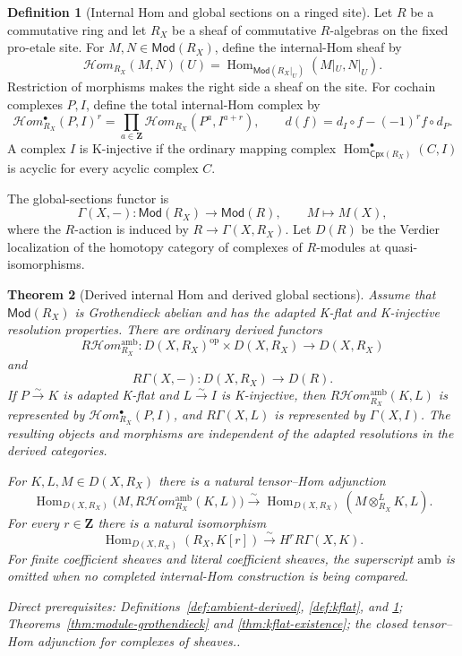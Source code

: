 \documentclass[10pt]{article}
\newtheorem{theorem}{Theorem}[section]
\theoremstyle{definition}
\newtheorem{definition}[theorem]{Definition}
\newcommand{\Hom}{\operatorname{Hom}}
\newcommand{\depends}[1]{\par\smallskip\noindent\textit{Direct prerequisites:} #1.}
\begin{document}
\begin{definition}[Internal Hom and global sections on a ringed site]
\label{def:ambient-hom-sections}
Let $R$ be a commutative ring and let $R_X$ be a sheaf of commutative
$R$-algebras on the fixed pro-etale site.  For
$M,N\in\mathsf{Mod}(R_X)$, define the internal-Hom sheaf by
\[
 \mathcal Hom_{R_X}(M,N)(U)=
 \Hom_{\mathsf{Mod}(R_X|_U)}(M|_U,N|_U).
\]
Restriction of morphisms makes the right side a sheaf on the site.  For
cochain complexes $P,I$, define the total internal-Hom complex by
\[
 \mathcal Hom_{R_X}^{\bullet}(P,I)^r
 =\prod_{a\in\mathbf Z}
   \mathcal Hom_{R_X}(P^a,I^{a+r}),
 \qquad
 d(f)=d_I\circ f-(-1)^r f\circ d_P.
\]
A complex $I$ is K-injective if the ordinary mapping complex
$\operatorname{Hom}^{\bullet}_{\mathsf{Cpx}(R_X)}(C,I)$ is acyclic for
every acyclic complex $C$.

The global-sections functor is
\[
 \Gamma(X,-):\mathsf{Mod}(R_X)\longrightarrow\mathsf{Mod}(R),
 \qquad M\longmapsto M(X),
\]
where the $R$-action is induced by $R\to\Gamma(X,R_X)$.  Let $D(R)$ be
the Verdier localization of the homotopy category of complexes of
$R$-modules at quasi-isomorphisms.
\end{definition}

\begin{theorem}[Derived internal Hom and derived global sections]
\label{thm:ambient-hom-sections}
Assume that $\mathsf{Mod}(R_X)$ is Grothendieck abelian and has the adapted
K-flat and K-injective resolution properties.  There are ordinary derived
functors
\[
 R\mathcal Hom_{R_X}^{\mathrm{amb}}:
 D(X,R_X)^{\mathrm{op}}\times D(X,R_X)
 \longrightarrow D(X,R_X)
\]
and
\[
 R\Gamma(X,-):D(X,R_X)\longrightarrow D(R).
\]
If $P\xrightarrow{\sim}K$ is adapted K-flat and
$L\xrightarrow{\sim}I$ is K-injective, then
$R\mathcal Hom_{R_X}^{\mathrm{amb}}(K,L)$ is represented by
$\mathcal Hom_{R_X}^{\bullet}(P,I)$, and $R\Gamma(X,L)$ is represented by
$\Gamma(X,I)$.  The resulting objects and morphisms are independent of
the adapted resolutions in the derived categories.

For $K,L,M\in D(X,R_X)$ there is a natural tensor--Hom adjunction
\[
 \Hom_{D(X,R_X)}
 \bigl(M,R\mathcal Hom_{R_X}^{\mathrm{amb}}(K,L)\bigr)
 \xrightarrow{\sim}
 \Hom_{D(X,R_X)}(M\otimes^L_{R_X}K,L).
\]
For every $r\in\mathbf Z$ there is a natural isomorphism
\[
 \Hom_{D(X,R_X)}(R_X,K[r])
 \xrightarrow{\sim}H^rR\Gamma(X,K).
\]
For finite coefficient sheaves and literal coefficient sheaves, the
superscript $\mathrm{amb}$ is omitted when no completed internal-Hom
construction is being compared.
\depends{Definitions~\ref{def:ambient-derived}, \ref{def:kflat}, and
\ref{def:ambient-hom-sections}; Theorems~\ref{thm:module-grothendieck}
and \ref{thm:kflat-existence}; the closed tensor--Hom adjunction for
complexes of sheaves.}
\end{theorem}
\end{document}
